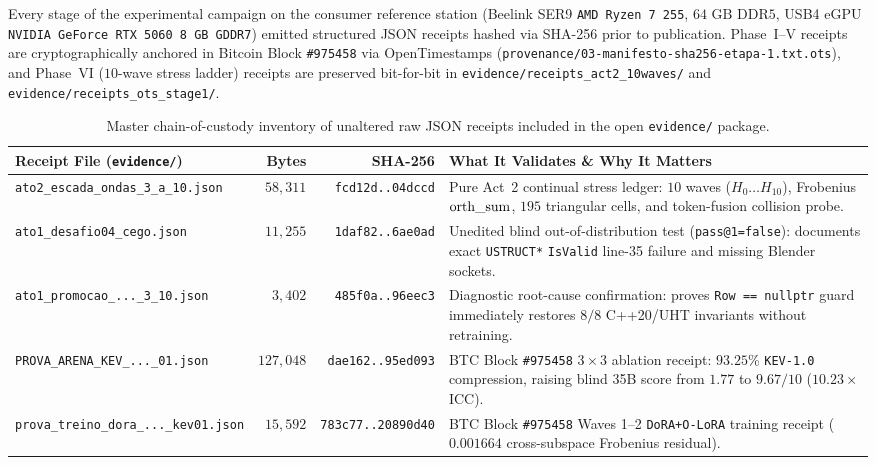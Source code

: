 \documentclass[10pt,a4paper]{article}
\begin{document}
Every stage of the experimental campaign on the consumer reference station (Beelink SER9 \texttt{AMD Ryzen 7 255}, $64\text{ GB DDR5}$, USB4 eGPU \texttt{NVIDIA GeForce RTX 5060 8 GB GDDR7}) emitted structured JSON receipts hashed via SHA-256 prior to publication. Phase~I--V receipts are cryptographically anchored in Bitcoin Block \texttt{\#975458} via OpenTimestamps (\texttt{provenance/03-manifesto-\allowbreak{}sha256-\allowbreak{}etapa-1.txt.ots}), and Phase~VI ($10$-wave stress ladder) receipts are preserved bit-for-bit in \texttt{evidence/receipts\_\allowbreak{}act2\_\allowbreak{}10waves/} and \texttt{evidence/receipts\_\allowbreak{}ots\_\allowbreak{}stage1/}.

\begin{table}[!htbp]
\centering
\caption{Master chain-of-custody inventory of unaltered raw JSON receipts included in the open \texttt{evidence/} package.}
\label{tab:receipts}
\footnotesize
\begin{tabularx}{\linewidth}{@{}lrrY@{}}
\toprule
\textbf{Receipt File (\texttt{evidence/})} & \textbf{Bytes} & \textbf{SHA-256} & \textbf{What It Validates \& Why It Matters} \\
\midrule
\texttt{ato2\_\allowbreak{}escada\_\allowbreak{}ondas\_\allowbreak{}3\_\allowbreak{}a\_\allowbreak{}10.json} & $58,311$ & \texttt{fcd12d..04dccd} & Pure Act~2 continual stress ledger: $10$ waves ($H_0\dots H_{10}$), Frobenius $\text{orth\_\allowbreak{}sum}$, $195$ triangular cells, and token-fusion collision probe. \\
\texttt{ato1\_\allowbreak{}desafio04\_\allowbreak{}cego.json} & $11,255$ & \texttt{1daf82..6ae0ad} & Unedited blind out-of-distribution test (\texttt{pass@1=false}): documents exact \texttt{USTRUCT*} \texttt{IsValid} line-35 failure and missing Blender sockets. \\
\texttt{ato1\_\allowbreak{}promocao\_\allowbreak{}...\_\allowbreak{}3\_\allowbreak{}10.json} & $3,402$ & \texttt{485f0a..96eec3} & Diagnostic root-cause confirmation: proves \texttt{Row == nullptr} guard immediately restores $8/8$ C++20/UHT invariants without retraining. \\
\texttt{PROVA\_\allowbreak{}ARENA\_\allowbreak{}KEV\_\allowbreak{}...\_\allowbreak{}01.json} & $127,048$ & \texttt{dae162..95ed093} & BTC Block \texttt{\#975458} $3\times 3$ ablation receipt: $93.25\%$ \texttt{KEV-1.0} compression, raising blind 35B score from $1.77$ to $9.67/10$ ($10.23\times$ $\text{ICC}$). \\
\texttt{prova\_\allowbreak{}treino\_\allowbreak{}dora\_\allowbreak{}...\_\allowbreak{}kev01.json} & $15,592$ & \texttt{783c77..20890d40} & BTC Block \texttt{\#975458} Waves 1--2 \texttt{DoRA+O-LoRA} training receipt ($0.001664$ cross-subspace Frobenius residual). \\

\end{tabularx}
\end{table}
\end{document}
